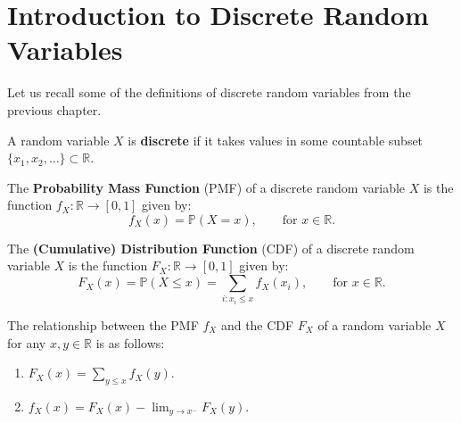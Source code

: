 \documentclass{huhtakm-template-book-v2}
\newcommand{\prob}{\mathbb{P}}
\begin{document}
\section{Introduction to Discrete Random Variables}
    Let us recall some of the definitions of discrete random variables from the previous chapter.
    \begin{defn}
        A random variable $X$ is \textbf{discrete} if it takes values in some countable subset $\{x_{1},x_{2},\dots\}\subset\mathbb{R}$.
    \end{defn}
    \begin{defn}
        The \textbf{Probability Mass Function} (PMF) of a discrete random variable $X$ is the function $f_{X}:\mathbb{R} \to [0,1]$ given by:
        \begin{equation*}
            f_{X}(x) = \prob(X = x), \qquad\text{for }x \in \mathbb{R}.
        \end{equation*}
    \end{defn}
    \begin{defn}
        The \textbf{(Cumulative) Distribution Function} (CDF) of a discrete random variable $X$ is the function $F_{X}:\mathbb{R} \to [0,1]$ given by:
        \begin{equation*}
            F_{X}(x) = \prob(X \leq x) = \sum_{i:x_{i} \leq x}f_{X}(x_{i}), \qquad\text{for }x \in \mathbb{R}.
        \end{equation*}
    \end{defn}
    \begin{lem}
        \label{Chapter 4 (Lemma) Relationship between PMF and CDF}
        The relationship between the PMF $f_{X}$ and the CDF $F_{X}$ of a random variable $X$ for any $x,y \in \mathbb{R}$ is as follows:
        \begin{enumerate}
            \item $F_{X}(x) = \sum_{y \leq x}f_{X}(y)$.
            \item $f_{X}(x) = F_{X}(x)-\lim_{y \to x^{-}}F_{X}(y)$.
        \end{enumerate}
    \end{lem}
\end{document}
